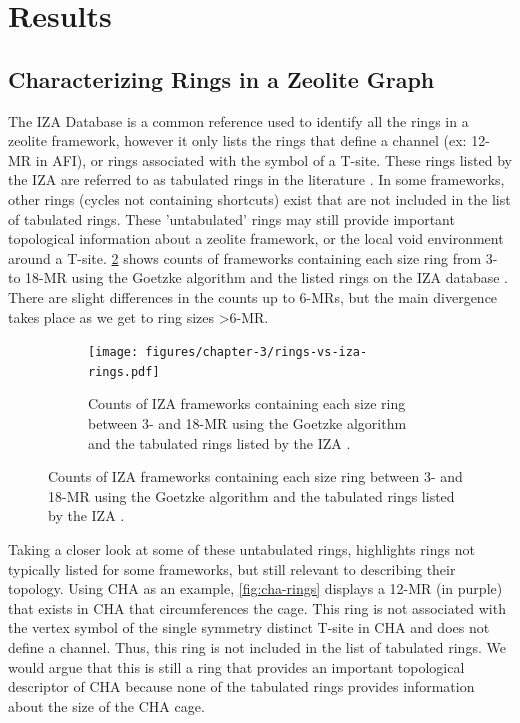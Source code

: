 \documentclass[preprint,numrefs,noinfo,sort&compress]{elsarticle}
\providecommand{\DIFaddbegin}{} %
\providecommand{\DIFaddend}{} %
\providecommand{\DIFdelbegin}{} %
\providecommand{\DIFdelend}{} %
\newcommand{\DIFscaledelfig}{0.5}
\newlength{\DIFdelgraphicswidth} %
\newlength{\DIFdelgraphicsheight} %
\newcommand{\DIFaddincludegraphics}[2][]{{\color{blue}\fbox{\DIFOincludegraphics[#1]{#2}}}} %
\newcommand{\DIFdelincludegraphics}[2][]{%
\sbox{\DIFdelgraphicsbox}{\DIFOincludegraphics[#1]{#2}}%
\settoboxwidth{\DIFdelgraphicswidth}{\DIFdelgraphicsbox} %
\settoboxtotalheight{\DIFdelgraphicsheight}{\DIFdelgraphicsbox} %
\scalebox{\DIFscaledelfig}{%
\parbox[b]{\DIFdelgraphicswidth}{\usebox{\DIFdelgraphicsbox}\\[-\baselineskip] \rule{\DIFdelgraphicswidth}{0em}}\llap{\resizebox{\DIFdelgraphicswidth}{\DIFdelgraphicsheight}{%
\setlength{\unitlength}{\DIFdelgraphicswidth}%
\begin{picture}(1,1)%
\thicklines\linethickness{2pt} %
{\color[rgb]{1,0,0}\put(0,0){\framebox(1,1){}}}%
{\color[rgb]{1,0,0}\put(0,0){\line( 1,1){1}}}%
{\color[rgb]{1,0,0}\put(0,1){\line(1,-1){1}}}%
\end{picture}%
}\hspace*{3pt}}} %
} %
\DeclareRobustCommand{\DIFaddbegin}{\DIFOaddbegin \let\includegraphics\DIFaddincludegraphics} %
\DeclareRobustCommand{\DIFaddend}{\DIFOaddend \let\includegraphics\DIFOincludegraphics} %
\DeclareRobustCommand{\DIFdelbegin}{\DIFOdelbegin \let\includegraphics\DIFdelincludegraphics} %
\DeclareRobustCommand{\DIFdelend}{\DIFOaddend \let\includegraphics\DIFOincludegraphics} %
\begin{document}
\section{Results}
\DIFdelbegin %
\DIFdelend \DIFaddbegin \label{sec:org47268f3}
\DIFaddend \subsection{Characterizing Rings in a Zeolite Graph}
\DIFdelbegin %
\DIFdelend \DIFaddbegin \label{sec:orgdbc479c}
\DIFaddend The IZA Database \cite{baerlocher-database-nodate} is a common reference used to identify all the rings in a zeolite framework, however it only lists the rings that define a channel (ex: 12-MR in AFI), or rings associated with the symbol of a T-site. These rings listed by the IZA are referred to as tabulated rings in the literature \cite{curtis-statistical-2003}. In some frameworks, other rings (cycles not containing shortcuts) exist that are not included in the list of tabulated rings. These 'untabulated' rings may still provide important topological information about a zeolite framework, or the local void environment around a T-site. \cref{fig:fw-counts} shows counts of frameworks containing each size ring from 3- to 18-MR using the Goetzke algorithm and the listed rings on the IZA database \cite{baerlocher-database-nodate}. There are slight differences in the counts up to 6-MRs, but the main divergence takes place as we get to ring sizes \textgreater6-MR.

\begin{figure}
\begin{figure}[H]
\centering
\texttt{[image: figures/chapter-3/rings-vs-iza-rings.pdf]}
\caption{Counts of IZA frameworks containing each size ring between 3- and 18-MR using the Goetzke algorithm and the tabulated rings listed by the IZA \cite{baerlocher-database-nodate}. \label{fig:fw-counts}}
\end{figure}
\end{figure}

Taking a closer look at some of these untabulated rings, highlights rings not typically listed for some frameworks, but still relevant to describing their topology. Using CHA as an example, \cref{fig:cha-rings} displays a 12-MR (in purple) that exists in CHA that circumferences the cage. This ring is not associated with the vertex symbol of the single symmetry distinct T-site in CHA and does not define a channel. Thus, this ring is not included in the list of tabulated rings. We would argue that this is still a ring that provides an important topological descriptor of CHA because none of the tabulated rings provides information about the size of the CHA cage. 
\end{document}

